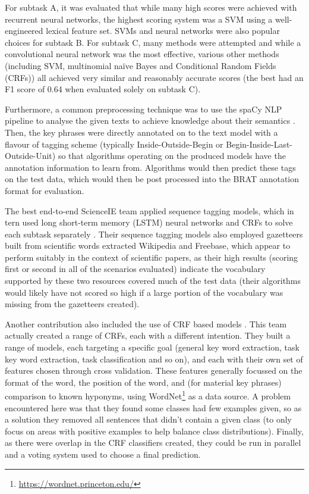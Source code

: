 For subtask A, it was evaluated that while many high scores were achieved with recurrent neural networks, the highest scoring system was a SVM using a well-engineered lexical feature set. SVMs and neural networks were also popular choices for subtask B. For subtask C, many methods were attempted and while a convolutional neural network was the most effective, various other methods (including SVM, multinomial naïve Bayes and Conditional Random Fields (CRFs)) all achieved very similar and reasonably accurate scores (the best had an F1 score of 0.64 when evaluated solely on subtask C).

Furthermore, a common preprocessing technique was to use the spaCy NLP pipeline to analyse the given texts to achieve knowledge about their semantics \cite{Honnibal2015}. Then, the key phrases were directly annotated on to the text model with a flavour of tagging scheme (typically Inside-Outside-Begin or Begin-Inside-Last-Outside-Unit) so that algorithms operating on the produced models have the annotation information to learn from. Algorithms would then predict these tags on the test data, which would then be post processed into the BRAT annotation format for evaluation.

The best end-to-end ScienceIE team applied sequence tagging models, which in tern used long short-term memory (LSTM) neural networks and CRFs to solve each subtask separately \cite{Ammar2017}. Their sequence tagging models also employed gazetteers built from scientific words extracted Wikipedia and Freebase, which appear to perform suitably in the context of scientific papers, as their high results (scoring first or second in all of the scenarios evaluated) indicate the vocabulary supported by these two resources covered much of the test data (their algorithms would likely have not scored so high if a large portion of the vocabulary was missing from the gazetteers created).

Another contribution also included the use of CRF based models \cite{Marsi2017}. This team actually created a range of CRFs, each with a different intention. They built a range of models, each targeting a specific goal (general key word extraction, task key word extraction, task classification and so on), and each with their own set of features chosen through cross validation. These features generally focussed on the format of the word, the position of the word, and (for material key phrases) comparison to known hyponyms, using WordNet\footnote{\href{https://wordnet.princeton.edu/}{https://wordnet.princeton.edu/}} as a data source. A problem encountered here was that they found some classes had few examples given, so as a solution they removed all sentences that didn't contain a given class (to only focus on areas with positive examples to help balance class distributions). Finally, as there were overlap in the CRF classifiers created, they could be run in parallel and a voting system used to choose a final prediction.

